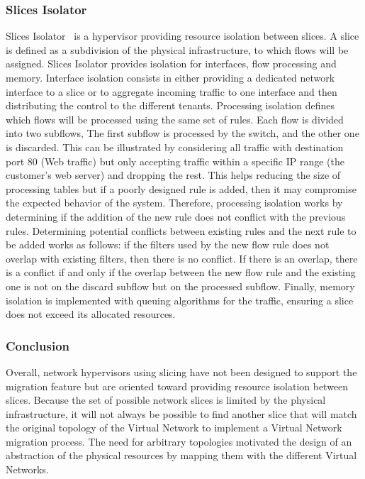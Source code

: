 \subsubsection{Slices Isolator}
Slices Isolator~\cite{SlicesIsolator-El-Azzab2011} is a hypervisor providing resource isolation between slices. A slice is defined as a subdivision of the physical infrastructure, to which flows will be assigned. Slices Isolator provides isolation for interfaces, flow processing and memory. Interface isolation consists in either providing a dedicated network interface to a slice or to aggregate incoming traffic to one interface and then distributing the control to the different tenants. Processing isolation defines which flows will be processed using the same set of rules.
Each flow is divided into two subflows,  The first subflow is processed by the switch, and the other one is discarded. This can be illustrated by considering all traffic with destination port 80 (Web traffic) but only accepting traffic within a specific IP range (the customer's web server) and dropping the rest. This helps reducing the size of processing tables but if a poorly designed rule is added, then it may compromise the expected behavior of the system. Therefore, processing isolation works by determining if the addition of the new rule does not conflict with the previous rules. Determining potential conflicts between existing rules and the next rule to be added works as follows: if the filters used by the new flow rule does not overlap with existing filters, then there is no conflict.
If there is an overlap, there is a conflict if and only if the overlap between the new flow rule and the existing one is not on the discard subflow but on the processed subflow. Finally, memory isolation is implemented with queuing algorithms for the traffic, ensuring a slice does not exceed its allocated resources. 

\subsubsection{Conclusion} 
Overall, network hypervisors using slicing have not been designed to support the migration feature but are oriented toward providing resource isolation between slices. Because the set of possible network slices is limited by the physical infrastructure, it will not always be possible to find another slice that will match the original topology of the Virtual Network to implement a Virtual Network migration process. The need for arbitrary topologies motivated the design of an abstraction of the physical resources by mapping them with the different Virtual Networks.

